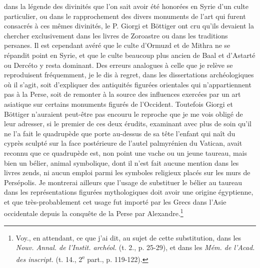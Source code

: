 \documentclass[a4paper, 11pt, oneside, polutonikogreek, french]{article}
\begin{document}
dans la légende des divinités que l'on sait avoir été honorées en Syrie d'un culte particulier, ou dans le rapprochement des divers monuments de l'art qui furent consacrés à ces mêmes divinités, le P. Giorgi et Böttiger ont cru qu'ils devaient la chercher exclusivement dans les livres de Zoroastre ou dans les traditions persanes. Il est cependant avéré que le culte d'Ormuzd et de Mithra ne se répandit point en Syrie, et que le culte beaucoup plus ancien de Baal et d'Astarté ou Dercéto y resta dominant. Des erreurs analogues à celle que je relève se reproduisent fréquemment, je le dis à regret, dans les dissertations archéologiques où il s'agit, soit d'expliquer des antiquités figurées orientales qui n'appartiennent pas à la Perse, soit de remonter à la source des influences exercées par un art asiatique sur certains monuments figurés de l'Occident. Toutefois Giorgi et Böttiger n'auraient peut-être pas encouru le reproche que je me vois obligé de leur adresser, si le premier de ces deux érudits, examinant avec plus de soin qu'il ne l'a fait le quadrupède que porte au-dessus de sa tête l'enfant qui naît du cyprès sculpté sur la face postérieure de l'autel palmyrénien du Vatican, avait reconnu que ce quadrupède est, non point une vache ou un jeune taureau, mais bien un bélier, animal symbolique, dont il n'est fait aucune mention dans les livres zends, ni aucun emploi parmi les symboles religieux placés sur les murs de Persépolis. Je montrerai ailleurs que l'usage de substituer le bélier au taureau dans les représentations figurées mythologiques doit avoir une origine égyptienne, et que très-probablement cet usage fut importé par les Grecs dans l'Asie occidentale depuis la conquête de la Perse par Alexandre.\footnote{Voy., en attendant, ce que j'ai dit, au sujet de cette substitution, dans les \emph{Nouv. Annal. de l'Instit. archéol.} (t. 2., p. 25-29), et dans les \emph{Mém. de l'Acad. des inscript.} (t. 14., 2\textsuperscript{e} part., p. 119-122).}
\end{document}
